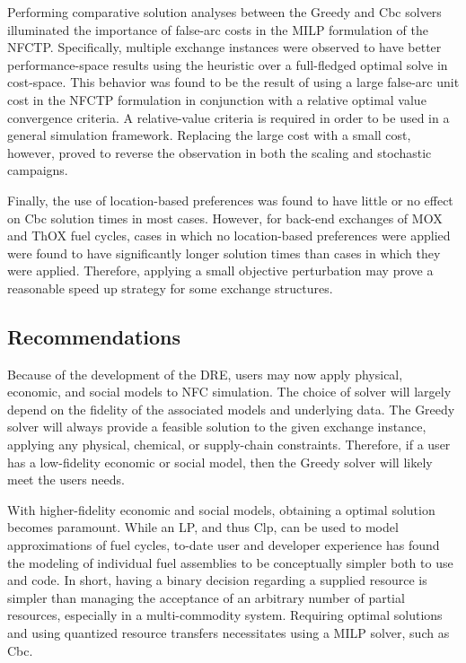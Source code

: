 Performing comparative solution analyses between the Greedy and Cbc solvers
illuminated the importance of false-arc costs in the MILP formulation of the
NFCTP. Specifically, multiple exchange instances were observed to have better
performance-space results using the heuristic over a full-fledged optimal solve
in cost-space. This behavior was found to be the result of using a large
false-arc unit cost in the NFCTP formulation in conjunction with a relative
optimal value convergence criteria. A relative-value criteria is required in
order to be used in a general simulation framework. Replacing the large cost
with a small cost, however, proved to reverse the observation in both the
scaling and stochastic campaigns. 

Finally, the use of location-based preferences was found to have little or no
effect on Cbc solution times in most cases. However, for back-end exchanges of
MOX and ThOX fuel cycles, cases in which no location-based preferences were
applied were found to have significantly longer solution times than cases in
which they were applied. Therefore, applying a small objective perturbation may
prove a reasonable speed up strategy for some exchange structures.

\subsection{Recommendations}

Because of the development of the DRE, users may now apply physical, economic,
and social models to NFC simulation. The choice of solver will largely depend on
the fidelity of the associated models and underlying data. The Greedy solver
will always provide a feasible solution to the given exchange instance, applying
any physical, chemical, or supply-chain constraints. Therefore, if a user has a
low-fidelity economic or social model, then the Greedy solver will likely meet
the users needs.

With higher-fidelity economic and social models, obtaining a optimal solution
becomes paramount. While an LP, and thus Clp, can be used to model
approximations of fuel cycles, to-date user and developer experience has found
the modeling of individual fuel assemblies to be conceptually simpler both to
use and code. In short, having a binary decision regarding a supplied resource
is simpler than managing the acceptance of an arbitrary number of partial
resources, especially in a multi-commodity system. Requiring optimal solutions
and using quantized resource transfers necessitates using a MILP solver, such as
Cbc.

